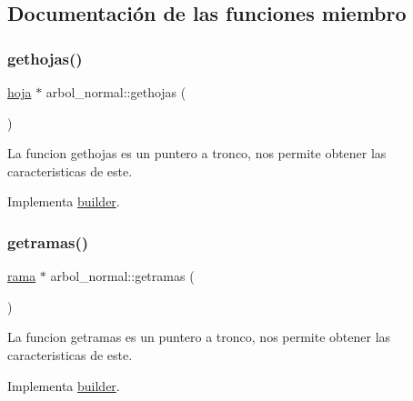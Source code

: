 \subsection{Documentación de las funciones miembro}
\mbox{\label{classarbol__normal_a999f324b73ff973d4b5b49e2403c637b}} 
\subsubsection{\texorpdfstring{gethojas()}{gethojas()}}
{\footnotesize\ttfamily \hyperlink{classhoja}{hoja} $\ast$ arbol\+\_\+normal\+::gethojas (\begin{DoxyParamCaption}{ }\end{DoxyParamCaption})\hspace{0.3cm}{\ttfamily [virtual]}}

La funcion gethojas es un puntero a tronco, nos permite obtener las caracteristicas de este. 

Implementa \hyperlink{classbuilder_a03de42e8ec33a22c3635a6e946061b70}{builder}.

\mbox{\label{classarbol__normal_a34c202fa845954e82719d3e86a5a0d9e}} 
\subsubsection{\texorpdfstring{getramas()}{getramas()}}
{\footnotesize\ttfamily \hyperlink{classrama}{rama} $\ast$ arbol\+\_\+normal\+::getramas (\begin{DoxyParamCaption}{ }\end{DoxyParamCaption})\hspace{0.3cm}{\ttfamily [virtual]}}

La funcion getramas es un puntero a tronco, nos permite obtener las caracteristicas de este. 

Implementa \hyperlink{classbuilder_a7b811cc1a2cffe9f3601faab0d85627b}{builder}.

\mbox{\label{classarbol__normal_a24fdce164b50a74414b6a3d5ad4e99f6}} 
